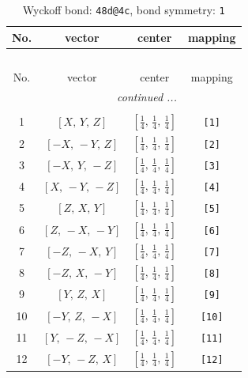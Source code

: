 \documentclass[fleqn,8pt]{jsarticle}
\begin{document}
\begin{longtable}{cccc}
\caption{Wyckoff bond: {\tt 48d@4c}, bond symmetry: {\tt 1}}
 \\
 \hline \hline
No. & vector & center & mapping \\ \hline \endfirsthead

\multicolumn{3}{l}{\tablename\ \thetable{}} \\
 \hline \hline
No. & vector & center & mapping \\ \hline \endhead

 \hline \hline
\multicolumn{3}{r}{\footnotesize\it continued ...} \\ \endfoot

 \hline \hline
\multicolumn{3}{r}{} \\ \endlastfoot

1 & $\left[ X,\, Y,\, Z \right]$ & $\left[ \frac{1}{4},\, \frac{1}{4},\, \frac{1}{4} \right]$ & {\tt [1]} \\ \hline
2 & $\left[ - X,\, - Y,\, Z \right]$ & $\left[ \frac{1}{4},\, \frac{1}{4},\, \frac{1}{4} \right]$ & {\tt [2]} \\ \hline
3 & $\left[ - X,\, Y,\, - Z \right]$ & $\left[ \frac{1}{4},\, \frac{1}{4},\, \frac{1}{4} \right]$ & {\tt [3]} \\ \hline
4 & $\left[ X,\, - Y,\, - Z \right]$ & $\left[ \frac{1}{4},\, \frac{1}{4},\, \frac{1}{4} \right]$ & {\tt [4]} \\ \hline
5 & $\left[ Z,\, X,\, Y \right]$ & $\left[ \frac{1}{4},\, \frac{1}{4},\, \frac{1}{4} \right]$ & {\tt [5]} \\ \hline
6 & $\left[ Z,\, - X,\, - Y \right]$ & $\left[ \frac{1}{4},\, \frac{1}{4},\, \frac{1}{4} \right]$ & {\tt [6]} \\ \hline
7 & $\left[ - Z,\, - X,\, Y \right]$ & $\left[ \frac{1}{4},\, \frac{1}{4},\, \frac{1}{4} \right]$ & {\tt [7]} \\ \hline
8 & $\left[ - Z,\, X,\, - Y \right]$ & $\left[ \frac{1}{4},\, \frac{1}{4},\, \frac{1}{4} \right]$ & {\tt [8]} \\ \hline
9 & $\left[ Y,\, Z,\, X \right]$ & $\left[ \frac{1}{4},\, \frac{1}{4},\, \frac{1}{4} \right]$ & {\tt [9]} \\ \hline
10 & $\left[ - Y,\, Z,\, - X \right]$ & $\left[ \frac{1}{4},\, \frac{1}{4},\, \frac{1}{4} \right]$ & {\tt [10]} \\ \hline
11 & $\left[ Y,\, - Z,\, - X \right]$ & $\left[ \frac{1}{4},\, \frac{1}{4},\, \frac{1}{4} \right]$ & {\tt [11]} \\ \hline
12 & $\left[ - Y,\, - Z,\, X \right]$ & $\left[ \frac{1}{4},\, \frac{1}{4},\, \frac{1}{4} \right]$ & {\tt [12]} \\
\end{longtable}
\end{document}

